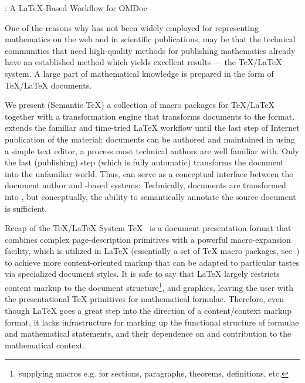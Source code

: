 
\begin{omgroup}[id=stex,creators=miko]
  {\protect\stex: A \texorpdfstring{\LaTeX}{LaTeX}-Based Workflow for OMDoc}

One of the reasons why {\omdoc} has not been widely employed for representing mathematics
on the web and in scientific publications, may be that the technical communities that need
high-quality methods for publishing mathematics already have an established method which
yields excellent results --- the {\TeX/\LaTeX} system. A large part of mathematical
knowledge is prepared in the form of {\TeX}/{\LaTeX} documents.

We present {\stex} (Semantic {\TeX}) a collection of macro packages for {\TeX/\LaTeX}
together with a transformation engine that transforms {\stex} documents to the {\omdoc}
format. {\stex} extends the familiar and time-tried {\LaTeX} workflow until the last step
of Internet publication of the material: documents can be authored and maintained in
{\stex} using a simple text editor, a process most technical authors are well familiar
with. Only the last (publishing) step (which is fully automatic) transforms the document
into the unfamiliar {\xml} world. Thus, {\stex} can serve as a conceptual interface
between the document author and {\omdoc}-based systems: Technically, {\stex} documents are
transformed into {\omdoc}, but conceptually, the ability to semantically annotate the
source document is sufficient.

\begin{omgroup}{Recap of the {\TeX/\LaTeX} System}
{\TeX}~\cite{Knuth:ttb84} is a document presentation format that combines complex
page-description primitives with a powerful macro-expansion facility, which is utilized in
{\LaTeX} (essentially a set of {\TeX} macro packages, see~\cite{Lamport:ladps94}) to
achieve more content-oriented markup that can be adapted to particular tastes via
specialized document styles. It is safe to say that {\LaTeX} largely restricts content
markup to the document structure\footnote{supplying macros e.g. for sections, paragraphs,
  theorems, definitions, etc.}, and graphics, leaving the user with the presentational
{\TeX} primitives for mathematical formulae. Therefore, even though {\LaTeX} goes a great
step into the direction of a content/context markup format, it lacks infrastructure for
marking up the functional structure of formulae and mathematical statements, and their
dependence on and contribution to the mathematical context.
 

\end{omgroup}
\end{omgroup}
